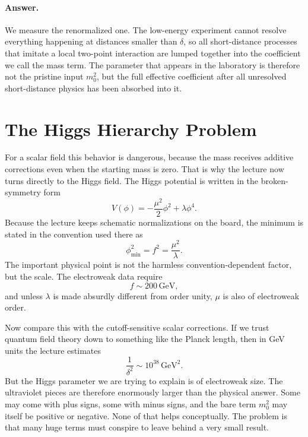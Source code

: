 \paragraph{Answer.} We measure the renormalized one. The low-energy experiment cannot resolve everything happening at distances smaller than \(\delta\), so all short-distance processes that imitate a local two-point interaction are lumped together into the coefficient we call the mass term. The parameter that appears in the laboratory is therefore not the pristine input \(m_0^2\), but the full effective coefficient after all unresolved short-distance physics has been absorbed into it.

\section{The Higgs Hierarchy Problem}

For a scalar field this behavior is dangerous, because the mass receives additive corrections even when the starting mass is zero. That is why the lecture now turns directly to the Higgs field. The Higgs potential is written in the broken-symmetry form
\begin{equation}
V(\phi)=-\frac{\mu^2}{2}\phi^2+\lambda\phi^4.
\end{equation}
Because the lecture keeps schematic normalizations on the board, the minimum is stated in the convention used there as
\begin{equation}
\phi_{\min}^2=f^2=\frac{\mu^2}{\lambda}.
\end{equation}
The important physical point is not the harmless convention-dependent factor, but the scale. The electroweak data require
\begin{equation}
f\sim 200\,\mathrm{GeV},
\end{equation}
and unless \(\lambda\) is made absurdly different from order unity, \(\mu\) is also of electroweak order.

Now compare this with the cutoff-sensitive scalar corrections. If we trust quantum field theory down to something like the Planck length, then in GeV units the lecture estimates
\begin{equation}
\frac{1}{\delta^2}\sim 10^{38}\,\mathrm{GeV}^2.
\end{equation}
But the Higgs parameter we are trying to explain is of electroweak size. The ultraviolet pieces are therefore enormously larger than the physical answer. Some may come with plus signs, some with minus signs, and the bare term \(m_0^2\) may itself be positive or negative. None of that helps conceptually. The problem is that many huge terms must conspire to leave behind a very small result.

